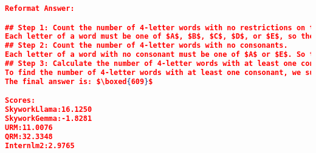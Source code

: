 \begin{lstlisting}[language=json,numbers=none]
Reformat Answer:

## Step 1: Count the number of 4-letter words with no restrictions on the word.
Each letter of a word must be one of $A$, $B$, $C$, $D$, or $E$, so the number of 4-letter words with no restrictions on the word is $5\times 5\times 5\times 5=625$.
## Step 2: Count the number of 4-letter words with no consonants.
Each letter of a word with no consonant must be one of $A$ or $E$. So the number of all 4-letter words with no consonants is $2\times 2\times 2\times 2=16$.
## Step 3: Calculate the number of 4-letter words with at least one consonant.
To find the number of 4-letter words with at least one consonant, we subtract the number of 4-letter words with no consonants from the total number of 4-letter words. Therefore, the number of 4-letter words with at least one consonant is $625-16=609$.
The final answer is: $\boxed{609}$

Scores:
SkyworkLlama:16.1250
SkyworkGemma:-1.8281
URM:11.0076
QRM:32.3348
Internlm2:2.9765
\end{lstlisting}